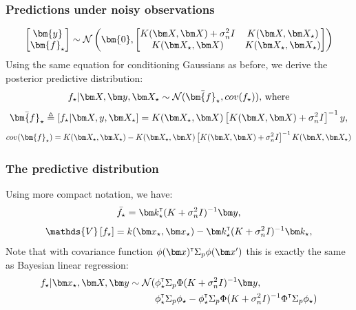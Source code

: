 \begin{frame}
\frametitle{Predictions under noisy observations}
\renewcommand\theequation{2.\thedefcounter}
\setcounter{defcounter}{21}
\begin{equation}
\begin{bmatrix}
\bm{y}\\
\bm{f}_{\star}
\end{bmatrix}
\sim \norm\left(
\bm{0},
\begin{bmatrix}
K(\bX, \bX) + \sigma_n^2 I & K(\bX, \bX_{\star})\\
K(\bX_{\star}, \bX) & K(\bX_{\star}, \bX_{\star})
\end{bmatrix}
\right)
\end{equation}
%
Using the same equation for conditioning Gaussians as before, we derive the posterior predictive distribution:
%
\small
\renewcommand\theequation{2.\thedefcounter}
\setcounter{defcounter}{22}
\begin{equation}
f_{\star} | \bX, \by, \bX_{\star} \sim \norm(\bar{\bm{f}_{\star}}, cov(f_{\star})) \text{, where}
\end{equation}
%
\setcounter{defcounter}{23}
\begin{equation}
\bar{\bm{f}_{\star}} \triangleq \left[ f_{\star} | \bX, y, \bX_{\star} \right] = K(\bX_{\star}, \bX) \left[ K(\bX, \bX)
+ \sigma_n^2 I \right]\inv y,
\end{equation}
%
\setcounter{defcounter}{24}
\begin{equation}
cov(\bm{f}_{\star}) = K(\bX_{\star}, \bX_{\star}) - K(\bX_{\star}, \bX)\left[ K(\bX, \bX)
+ \sigma_n^2 I \right]\inv K(\bX, \bX_{\star})
\end{equation}
\normalsize
\end{frame}



\begin{frame}
\frametitle{The predictive distribution}
Using more compact notation, we have:
\renewcommand\theequation{2.\thedefcounter}
\setcounter{defcounter}{25}
\begin{equation}
\bar{f_{\star}} = \bk_{\star}\transpose(K + \sigma_n^2 I)\inv\by,
\end{equation}
%
\setcounter{defcounter}{26}
\begin{equation}
\mathds{V} \left[ f_{\star} \right]  = k(\bx_{\star}, \bx_{\star}) - \bk_{\star}\transpose (K + \sigma_n^2
I)\inv\bk_{\star},
\end{equation}
Note that with covariance function $\phi(\bx)\transpose \Sigma_p \phi(\bx')$ this is exactly the same as
Bayesian linear regression:
%
\setcounter{defcounter}{12}
\begin{align}
f_{\star} | \bx_{\star}, \bX, \by \sim \norm(& \phi_{\star}\transpose \Sigma_p \Phi(K + \sigma_n^2I)\inv \by,\\
\nonumber{} & \phi_{\star}\transpose \Sigma_p\phi_{\star} - \phi_{\star}\transpose \Sigma_p \Phi(K + \sigma_n^2I)\inv \Phi\transpose \Sigma_p \phi_{\star})
\end{align}
%
\end{frame}

